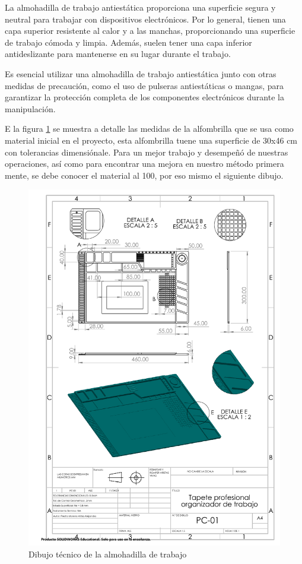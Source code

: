    La almohadilla de trabajo antiestática proporciona una superficie segura y neutral para trabajar con dispositivos electrónicos. Por lo general, tienen una capa superior resistente al calor y a las manchas, proporcionando una superficie de trabajo cómoda y limpia. Además, suelen tener una capa inferior antideslizante para mantenerse en su lugar durante el trabajo.
    
    Es esencial utilizar una almohadilla de trabajo antiestática junto con otras medidas de precaución, como el uso de pulseras antiestáticas o mangas, para garantizar la protección completa de los componentes electrónicos durante la manipulación.
    
    
    E la figura \ref{fig:almohadillaD} se muestra a detalle las medidas de la alfombrilla que se usa como material inicial en el proyecto, esta alfombrilla tuene una superficie de 30x46 cm con tolerancias dimensiónale. Para un mejor trabajo y desempeñó de nuestras operaciones, así como para encontrar una mejora en nuestro método primera mente, se debe conocer el material al 100, por eso mismo el siguiente dibujo.
    
    \begin{figure}[H]
        \centering
        \includegraphics[trim = {7mm 1mm 1mm 1mm},clip,scale=0.4]{22/Img/almohadillaDibujo.pdf}
        \caption{Dibujo técnico de la almohadilla de trabajo}
        \label{fig:almohadillaD}
    \end{figure}
    

